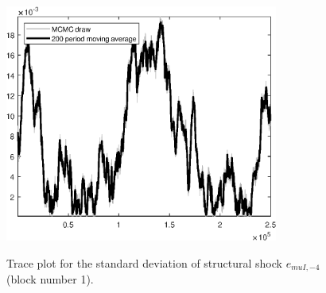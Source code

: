 \begin{figure}[H]
\centering
  \includegraphics[width=0.8\textwidth]{BRS_aggregate/graphs/TracePlot_SE_e_muI_news_blck_1}\\
    \caption{Trace plot for the standard deviation of structural shock ${e_{muI,-4}}$ (block number 1).}
\end{figure}
